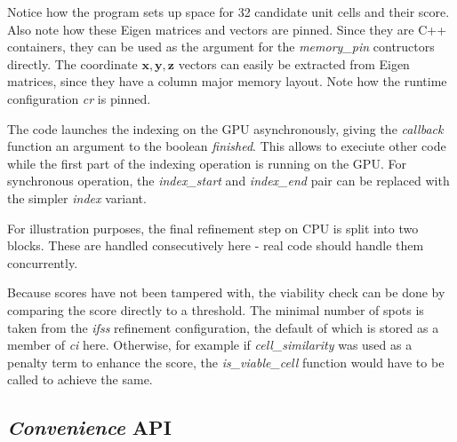 \documentclass[a4paper,10pt]{article}
\newcommand{\vect}[1]{\mathbf{#1}}
\begin{document}
%
Notice how the program sets up space for 32 candidate unit cells and their score. Also note how these Eigen matrices and vectors are pinned. Since they are C++ containers, they can be used as the argument for the \emph{memory\_pin} contructors directly. The coordinate $\vect{x},\vect{y},\vect{z}$ vectors can easily be extracted from Eigen matrices, since they have a column major memory layout. Note how the runtime configuration \emph{cr} is pinned.

The code launches the indexing on the GPU asynchronously, giving the \emph{callback} function an argument to the boolean \emph{finished}. This allows to execiute other code while the first part of the indexing operation is running on the GPU. For synchronous operation, the \emph{index\_start} and \emph{index\_end} pair can be replaced with the simpler \emph{index} variant.

For illustration purposes, the final refinement step on CPU is split into two blocks. These are handled consecutively here - real code should handle them concurrently.

Because scores have not been tampered with, the viability check can be done by comparing the score directly to a threshold. The minimal number of spots is taken from the \emph{ifss} refinement configuration, the default of which is stored as a member of \emph{ci} here. Otherwise, for example if \emph{cell\_similarity} was used as a penalty term to enhance the score, the \emph{is\_viable\_cell} function would have to be called to achieve the same.

\subsection{\emph{Convenience} API}
\end{document}
